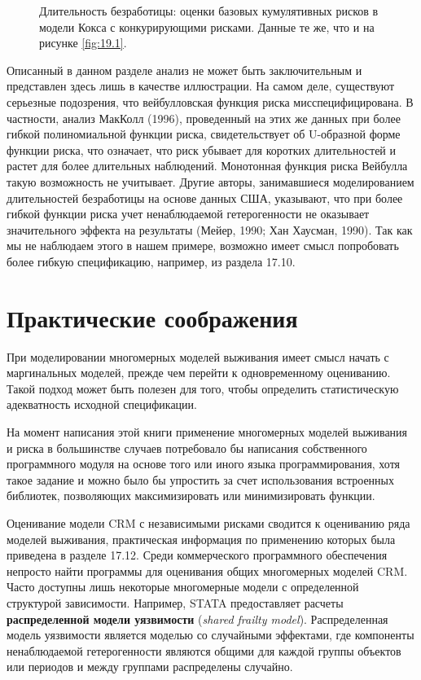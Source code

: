 \begin{figure}[ht!]\caption{Длительность безработицы: оценки базовых кумулятивных рисков в модели Кокса с конкурирующими рисками. Данные те же, что и на рисунке \ref{fig:19.1}.}\label{fig:19.2}
\centering
\end{figure}

Описанный в данном разделе анализ не может быть заключительным и представлен здесь лишь в качестве иллюстрации. На самом деле, существуют серьезные подозрения, что вейбулловская функция риска мисспецифицирована. В частности, анализ МакКолл (1996), проведенный на этих же данных при более гибкой полиномиальной функции риска, свидетельствует об U-образной форме функции риска, что означает, что риск убывает для коротких длительностей и растет для более длительных наблюдений. Монотонная функция риска Вейбулла такую возможность не учитывает. Другие авторы, занимавшиеся моделированием длительностей безработицы на основе данных США, указывают, что при более гибкой функции риска учет ненаблюдаемой гетерогенности не оказывает значительного эффекта на результаты (Мейер, 1990; Хан Хаусман, 1990). Так как мы не наблюдаем этого в нашем примере, возможно имеет смысл попробовать более гибкую спецификацию, например, из раздела 17.10. %



\section{Практические соображения}\label{sec:19.6}

\noindent
При моделировании многомерных моделей выживания имеет смысл начать с маргинальных моделей, прежде чем перейти к одновременному оцениванию. Такой подход может быть полезен для того, чтобы определить статистическую адекватность исходной спецификации.

На момент написания этой книги применение многомерных моделей выживания и риска в большинстве случаев потребовало бы написания собственного программного модуля на основе того или иного языка программирования, хотя такое задание и можно было бы упростить за счет использования встроенных библиотек, позволяющих максимизировать или минимизировать функции.

Оценивание модели CRM с независимыми рисками сводится к оцениванию ряда моделей выживания, практическая информация по применению которых была приведена в разделе 17.12. %
Среди коммерческого программного обеспечения непросто найти программы для оценивания общих многомерных моделей CRM. Часто доступны лишь некоторые многомерные модели с определенной структурой зависимости. Например, STATA предоставляет расчеты \textbf{распределенной модели уязвимости} (\textit{shared frailty model}). Распределенная модель уязвимости является моделью со случайными эффектами, где компоненты ненаблюдаемой гетерогенности являются общими для каждой группы объектов или периодов и между группами распределены случайно.

